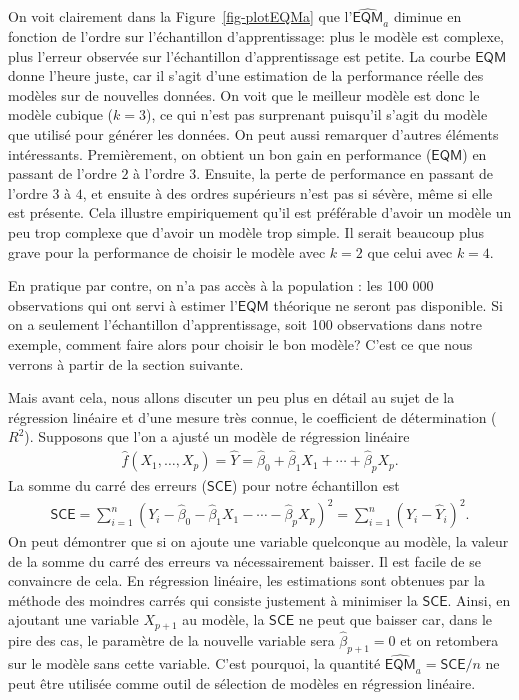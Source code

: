 \documentclass[
  11pt,
  letterpaper,
]{scrbook}
\theoremstyle{definition}
\theoremstyle{remark}
\begin{document}
On voit clairement dans la Figure~\ref{fig-plotEQMa} que
l'\(\widehat{\mathsf{EQM}}_a\) diminue en fonction de l'ordre sur
l'échantillon d'apprentissage: plus le modèle est complexe, plus
l'erreur observée sur l'échantillon d'apprentissage est petite. La
courbe \(\mathsf{EQM}\) donne l'heure juste, car il s'agit d'une
estimation de la performance réelle des modèles sur de nouvelles
données. On voit que le meilleur modèle est donc le modèle cubique
(\(k=3\)), ce qui n'est pas surprenant puisqu'il s'agit du modèle que
utilisé pour générer les données. On peut aussi remarquer d'autres
éléments intéressants. Premièrement, on obtient un bon gain en
performance (\(\mathsf{EQM}\)) en passant de l'ordre \(2\) à l'ordre
\(3\). Ensuite, la perte de performance en passant de l'ordre \(3\) à
\(4\), et ensuite à des ordres supérieurs n'est pas si sévère, même si
elle est présente. Cela illustre empiriquement qu'il est préférable
d'avoir un modèle un peu trop complexe que d'avoir un modèle trop
simple. Il serait beaucoup plus grave pour la performance de choisir le
modèle avec \(k=2\) que celui avec \(k=4\).

En pratique par contre, on n'a pas accès à la population : les 100 000
observations qui ont servi à estimer l'\(\mathsf{EQM}\) théorique ne
seront pas disponible. Si on a seulement l'échantillon d'apprentissage,
soit 100 observations dans notre exemple, comment faire alors pour
choisir le bon modèle? C'est ce que nous verrons à partir de la section
suivante.

Mais avant cela, nous allons discuter un peu plus en détail au sujet de
la régression linéaire et d'une mesure très connue, le coefficient de
détermination (\(R^2\)). Supposons que l'on a ajusté un modèle de
régression linéaire \begin{align*}
\widehat{f}(X_1, \ldots, X_p) = \widehat{Y}=\widehat{\beta}_0 + \widehat{\beta}_1X_1+ \cdots + \widehat{\beta}_p X_p.
\end{align*} La somme du carré des erreurs (\(\mathsf{SCE}\)) pour notre
échantillon est \begin{align*}
\mathsf{SCE}=\sum_{i=1}^n (Y_i - \widehat{\beta}_0 - \widehat{\beta}_1X_1 - \cdots - \widehat{\beta}_p X_p)^2 = \sum_{i=1}^n (Y_i-\widehat{Y}_i)^2.
 \end{align*} On peut démontrer que si on ajoute une variable quelconque
au modèle, la valeur de la somme du carré des erreurs va nécessairement
baisser. Il est facile de se convaincre de cela. En régression linéaire,
les estimations sont obtenues par la méthode des moindres carrés qui
consiste justement à minimiser la \(\mathsf{SCE}\). Ainsi, en ajoutant
une variable \(X_{p+1}\) au modèle, la \(\mathsf{SCE}\) ne peut que
baisser car, dans le pire des cas, le paramètre de la nouvelle variable
sera \(\widehat{\beta}_{p+1}=0\) et on retombera sur le modèle sans
cette variable. C'est pourquoi, la quantité
\(\widehat{\mathsf{EQM}}_a=\mathsf{SCE}/n\) ne peut être utilisée comme
outil de sélection de modèles en régression linéaire.
\end{document}
